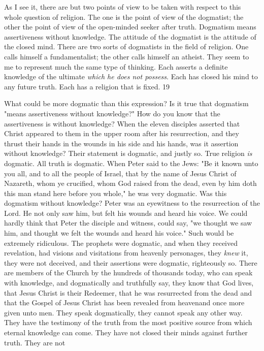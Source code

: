 As I see it, there are but two points of view to be taken with respect to this whole question of
religion. The one is the point of view of the dogmatist; the other the point of view of the
open-minded seeker after truth. Dogmatism means assertiveness without knowledge. The
attitude of the dogmatist is the attitude of the closed mind. There are two sorts of dogmatists
in the field of religion. One calls himself a fundamentalist; the other calls himself an atheist.
They seem to me to represent much the same type of thinking. Each asserts a definite
knowledge of the ultimate \textit{which he does not possess}. Each has closed his mind to any future
truth. Each has a religion that is fixed. 19

What could be more dogmatic than this expression? Is it true that dogmatism "means
assertiveness without knowledge?" How do you know that the assertiveness is without
knowledge? When the eleven disciples asserted that Christ appeared to them in the upper
room after his resurrection, and they thrust their hands in the wounds in his side and his
hands, was it assertion without knowledge? Their statement is dogmatic, and justly so. True
religion \textit{is} dogmatic. All truth is dogmatic. When Peter said to the Jews: "Be it known unto
you all, and to all the people of Israel, that by the name of Jesus Christ of Nazareth, whom ye
crucified, whom God raised from the dead, even by him doth this man stand here before you
whole," he was very dogmatic. Was this dogmatism without knowledge? Peter was an
eyewitness to the resurrection of the Lord. He not only saw him, but felt his wounds and
heard his voice. We could hardly think that Peter the disciple and witness, could say, "we
thought we saw him, and thought we felt the wounds and heard his voice." Such would be
extremely ridiculous. The prophets were dogmatic, and when they received revelation, had
visions and visitations from heavenly personages, they \textit{knew} it, they were not deceived, and
their assertions were dogmatic, righteously so. There are members of the Church by the
hundreds of thousands today, who can speak with knowledge, and dogmatically and
truthfully say, they know that God lives, that Jesus Christ is their Redeemer, that he was
resurrected from the dead and that the Gospel of Jesus Christ has been revealed from heavenand once more given unto men. They speak dogmatically, they cannot speak any other way.
They have the testimony of the truth from the most positive source from which eternal
knowledge can come. They have not closed their minds against further truth. They are not
